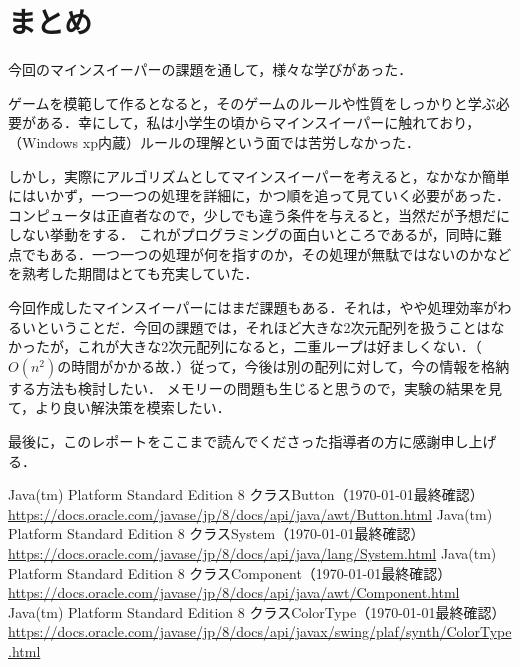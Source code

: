 \documentclass[a4j,11pt]{jsarticle}
\begin{document}
\part{まとめ}
今回のマインスイーパーの課題を通して，様々な学びがあった．\par
ゲームを模範して作るとなると，そのゲームのルールや性質をしっかりと学ぶ必要がある．幸にして，私は小学生の頃からマインスイーパーに触れており，（Windows xp内蔵）ルールの理解という面では苦労しなかった．\par
しかし，実際にアルゴリズムとしてマインスイーパーを考えると，なかなか簡単にはいかず，一つ一つの処理を詳細に，かつ順を追って見ていく必要があった．コンピュータは正直者なので，少しでも違う条件を与えると，当然だが予想だにしない挙動をする．
これがプログラミングの面白いところであるが，同時に難点でもある．一つ一つの処理が何を指すのか，その処理が無駄ではないのかなどを熟考した期間はとても充実していた．\par
今回作成したマインスイーパーにはまだ課題もある．それは，やや処理効率がわるいということだ．今回の課題では，それほど大きな2次元配列を扱うことはなかったが，これが大きな2次元配列になると，二重ループは好ましくない．（\(O(n^2)\)の時間がかかる故．）従って，今後は別の配列に対して，今の情報を格納する方法も検討したい．
メモリーの問題も生じると思うので，実験の結果を見て，より良い解決策を模索したい．\par
最後に，このレポートをここまで読んでくださった指導者の方に感謝申し上げる．
\begin{thebibliography}{99}
     Java(tm) Platform Standard Edition 8 クラスButton（\today 最終確認）\\
    \url{https://docs.oracle.com/javase/jp/8/docs/api/java/awt/Button.html}
     Java(tm) Platform Standard Edition 8 クラスSystem（\today 最終確認）\\
    \url{https://docs.oracle.com/javase/jp/8/docs/api/java/lang/System.html}
     Java(tm) Platform Standard Edition 8 クラスComponent（\today 最終確認）\\
    \url{https://docs.oracle.com/javase/jp/8/docs/api/java/awt/Component.html}
     Java(tm) Platform Standard Edition 8 クラスColorType（\today 最終確認）\\
    \small\url{https://docs.oracle.com/javase/jp/8/docs/api/javax/swing/plaf/synth/ColorType.html}
\end{thebibliography}
\end{document}
